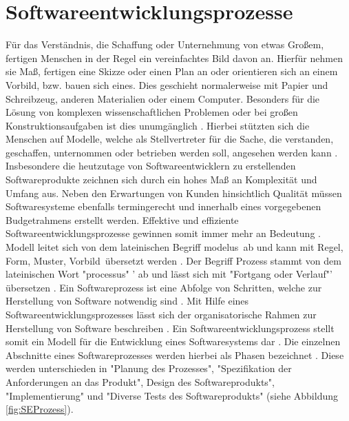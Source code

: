 \section{Softwareentwicklungsprozesse}\label{sec:chapter.2: Softwareentwicklungsprozesse}

Für das Verständnis, die Schaffung oder Unternehmung von etwas Großem, fertigen Menschen in der Regel ein vereinfachtes Bild davon an. Hierfür nehmen sie Maß, fertigen eine Skizze oder einen Plan an oder orientieren sich an einem Vorbild, bzw. bauen sich eines. Dies geschieht normalerweise mit Papier und Schreibzeug, anderen Materialien oder einem Computer. Besonders für die Lösung von komplexen wissenschaftlichen Problemen oder bei großen Konstruktionsaufgaben ist dies unumgänglich \cite{Hesse2008}. \newline
Hierbei stützten sich die Menschen auf Modelle, welche als Stellvertreter für die Sache, die verstanden, geschaffen, unternommen oder betrieben werden soll, angesehen werden kann \cite{Hesse2008}. \newline
Insbesondere die heutzutage von Softwareentwicklern zu erstellenden Softwareprodukte zeichnen sich durch ein hohes Maß an Komplexität und Umfang aus. Neben den Erwartungen von Kunden hinsichtlich Qualität müssen Softwaresysteme ebenfalls termingerecht und innerhalb eines vorgegebenen Budgetrahmens erstellt werden. Effektive und effiziente Softwareentwicklungsprozesse gewinnen somit immer mehr an Bedeutung \cite{Grechenig2010}.
Modell leitet sich von dem lateinischen Begriff  \glqq modelus\grqq \ 
ab und kann mit  \glqq Regel, Form, Muster, Vorbild\grqq \ übersetzt werden \cite{Hesse2008}. 
Der Begriff Prozess stammt von dem lateinischen Wort "processus" ' ab und lässt sich mit "Fortgang oder Verlauf"' übersetzen \cite{koch2011, Staud2006}. \newline 
Ein Softwareprozess ist eine Abfolge von Schritten, welche zur Herstellung von Software notwendig sind \cite{Mishra2012, Stoerrle2005}. Mit Hilfe eines Softwareentwicklungsprozesses lässt sich der organisatorische Rahmen zur Herstellung von Software beschreiben \cite{Koelmel2000}. Ein Softwareentwicklungsprozess stellt somit ein Modell für die Entwicklung eines Softwaresystems dar \cite{Hanser2010}. Die einzelnen Abschnitte eines Softwareprozesses werden hierbei als Phasen bezeichnet \cite{Stoerrle2005}. Diese werden unterschieden in "Planung des Prozesses", "Spezifikation der Anforderungen an das Produkt", Design des Softwareprodukts", "Implementierung" und "Diverse Tests des Softwareprodukts" (siehe Abbildung \ref{fig:SEProzess}).

